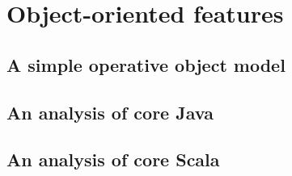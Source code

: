 \part{Object-oriented features}
    \chapter{A simple operative object model}
    \chapter{An analysis of core Java}
    \chapter{An analysis of core Scala}



\nocite{*}







